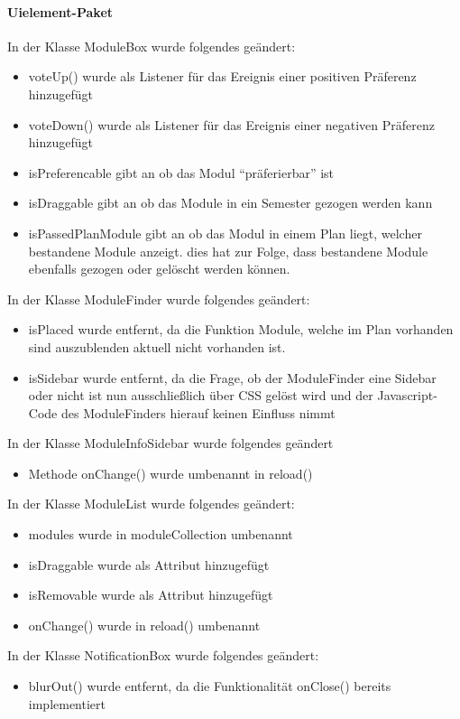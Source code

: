 \paragraph{Uielement-Paket}
In der Klasse ModuleBox wurde folgendes geändert:
\begin{itemize}
	\item voteUp() wurde als Listener für das Ereignis einer positiven Präferenz hinzugefügt
	\item voteDown() wurde als Listener für das Ereignis einer negativen Präferenz hinzugefügt
	\item isPreferencable gibt an ob das Modul \enquote{präferierbar} ist
	\item isDraggable gibt an ob das Module in ein Semester gezogen werden kann
	\item isPassedPlanModule gibt an ob das Modul in einem Plan liegt, welcher bestandene Module anzeigt. dies hat zur Folge, dass bestandene Module ebenfalls gezogen oder gelöscht werden können.
\end{itemize}
In der Klasse ModuleFinder wurde folgendes geändert:
\begin{itemize}
	\item isPlaced wurde entfernt, da die Funktion Module, welche im Plan vorhanden sind auszublenden aktuell nicht vorhanden ist.
	\item isSidebar wurde entfernt, da die Frage, ob der ModuleFinder eine Sidebar oder nicht ist nun ausschließlich über CSS gelöst wird und der Javascript-Code des ModuleFinders hierauf keinen Einfluss nimmt
\end{itemize}
In der Klasse ModuleInfoSidebar wurde folgendes geändert
\begin{itemize}
	\item Methode onChange() wurde umbenannt in reload()
\end{itemize}
In der Klasse ModuleList wurde folgendes geändert:
\begin{itemize}
	\item modules wurde in moduleCollection umbenannt
	\item isDraggable wurde als Attribut hinzugefügt
	\item isRemovable wurde als Attribut hinzugefügt
	\item onChange() wurde in reload() umbenannt
\end{itemize}
In der Klasse NotificationBox wurde folgendes geändert:
\begin{itemize}
	\item blurOut() wurde entfernt, da die Funktionalität onClose() bereits implementiert
\end{itemize}
